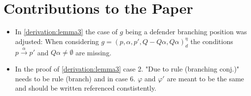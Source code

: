 \section{Contributions to the Paper}

\begin{itemize}
\item In \ref{derivation:lemma3} the case of $g$ being a defender branching position was adjusted: 
When considering $g=(p,\alpha ,p', Q- Q \alpha, Q \alpha)_d^\eta$ the conditions $p \overset{\alpha}{\longrightarrow} p'$ and $Q \alpha \neq \emptyset$ are 
missing. 
\item In the proof of \ref{derivation:lemma3} case 2. "Due to rule (branching conj.)" needs to be 
rule (branch) and in case 6. $\varphi $ and $\varphi '$ are meant to be the same and should be 
written referenced constistently.
\end{itemize}